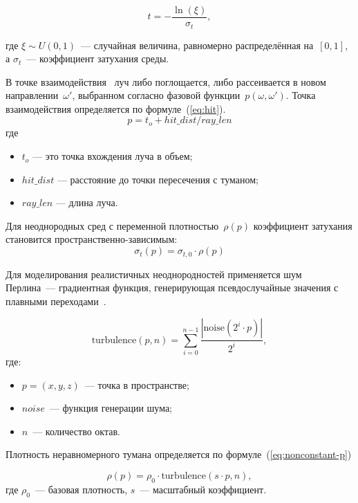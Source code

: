\begin{equation}
t = -\frac{\ln(\xi)}{\sigma_t},
\end{equation}

\noindent где $\xi \sim U(0, 1)$~--- случайная величина, равномерно распределённая на~$[0, 1]$, а $\sigma_t$~--- коэффициент затухания среды.

В точке взаимодействия~\cite{Shirley2025RTW2} луч либо поглощается, либо рассеивается в новом направлении~$\omega'$, выбранном согласно фазовой функции~$p(\omega, \omega')$.
Точка взаимодействия определяется по формуле~(\ref{eq:hit}).
\begin{equation}
    \label{eq:hit}
    p = t_o + hit\_dist / ray\_len
\end{equation}
где \begin{itemize}
    \item $t_o$ --- это точка вхождения луча в объем;
    \item $hit\_dist$ --- расстояние до точки пересечения с туманом;
    \item $ray\_len$ --- длина луча.
\end{itemize}

Для неоднородных сред с переменной плотностью~$\rho(p)$ коэффициент затухания становится пространственно-зависимым:
\begin{equation}
\sigma_t(p) = \sigma_{t,0} \cdot \rho(p)
\end{equation}

Для моделирования реалистичных неоднородностей применяется шум Перлина~--- градиентная функция,
генерирующая псевдослучайные значения с плавными переходами~\cite{perlin-noise}.

\begin{equation}
   \text{turbulence}(p, n) = \sum_{i=0}^{n-1} \frac{|\text{noise}(2^i \cdot p)|}{2^i}, 
\end{equation}
\noindent где:
\begin{itemize}
    \item $p = (x, y, z)$~--- точка в пространстве;
    \item $noise$~--- функция генерации шума;
    \item $n$~--- количество октав.
\end{itemize}

Плотность неравномерного тумана определяется по формуле~(\ref{eq:nonconstant-p})

\begin{equation}
    \label{eq:nonconstant-p}
    \rho(p) = \rho_0 \cdot \text{turbulence}(s \cdot p, n),
\end{equation}
\noindent где $\rho_0$~--- базовая плотность, $s$~--- масштабный коэффициент.

